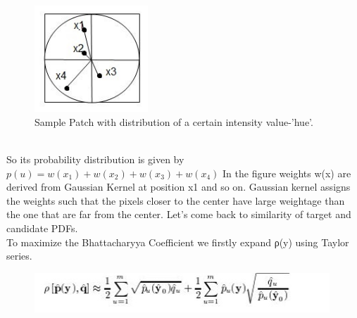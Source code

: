 \documentclass[a4paper,12pt,oneside]{book}
\begin{document}
    \begin{figure}[h!]
		\includegraphics[width=0.5\linewidth, height=4cm]{img.jpg}
		\centering
		\caption{Sample Patch with distribution of a certain intensity value-'hue'.}
	\end{figure}\\
    
    So its probability distribution is given by $p(u)= w(x_1)+w(x_2)+w(x_3 )+w(x_4)$
In the figure weights w(x) are derived from Gaussian Kernel at position x1 and so on. Gaussian kernel assigns the weights such that the pixels closer to the center have large weightage than the one that are far from the center.
Let’s come back to similarity of target and candidate PDFs.\\

To maximize the Bhattacharyya Coefficient we firstly expand ρ(y)  using Taylor series.\\
    \begin{figure}[h!]
    \includegraphics[width=1\linewidth, height=1.5cm]{eq5.jpg}
	\end{figure}\\
\end{document}
